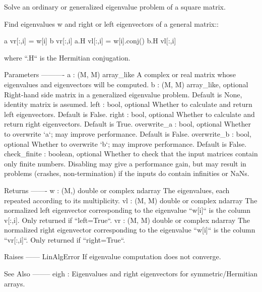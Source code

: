 \begin{DoxyVerb}Solve an ordinary or generalized eigenvalue problem of a square matrix.

Find eigenvalues w and right or left eigenvectors of a general matrix::

    a   vr[:,i] = w[i]        b   vr[:,i]
    a.H vl[:,i] = w[i].conj() b.H vl[:,i]

where ``.H`` is the Hermitian conjugation.

Parameters
----------
a : (M, M) array_like
    A complex or real matrix whose eigenvalues and eigenvectors
    will be computed.
b : (M, M) array_like, optional
    Right-hand side matrix in a generalized eigenvalue problem.
    Default is None, identity matrix is assumed.
left : bool, optional
    Whether to calculate and return left eigenvectors.  Default is False.
right : bool, optional
    Whether to calculate and return right eigenvectors.  Default is True.
overwrite_a : bool, optional
    Whether to overwrite `a`; may improve performance.  Default is False.
overwrite_b : bool, optional
    Whether to overwrite `b`; may improve performance.  Default is False.
check_finite : boolean, optional
    Whether to check that the input matrices contain only finite numbers.
    Disabling may give a performance gain, but may result in problems
    (crashes, non-termination) if the inputs do contain infinities or NaNs.

Returns
-------
w : (M,) double or complex ndarray
    The eigenvalues, each repeated according to its multiplicity.
vl : (M, M) double or complex ndarray
    The normalized left eigenvector corresponding to the eigenvalue
    ``w[i]`` is the column v[:,i]. Only returned if ``left=True``.
vr : (M, M) double or complex ndarray
    The normalized right eigenvector corresponding to the eigenvalue
    ``w[i]`` is the column ``vr[:,i]``.  Only returned if ``right=True``.

Raises
------
LinAlgError
    If eigenvalue computation does not converge.

See Also
--------
eigh : Eigenvalues and right eigenvectors for symmetric/Hermitian arrays.\end{DoxyVerb}
 \hypertarget{namespacescipy_1_1linalg_1_1decomp_a3a09100409f2de4d5f8cc2ecfc3cc507}{}
